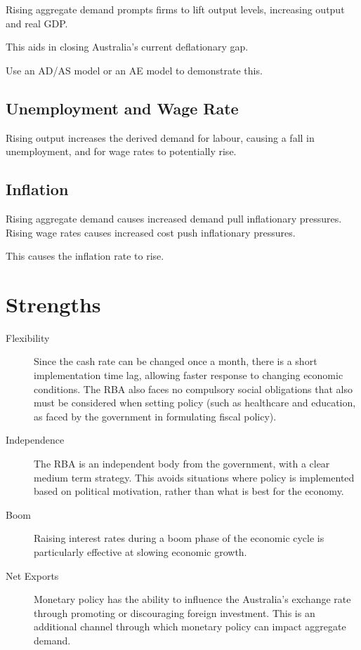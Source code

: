 \documentclass[a4paper,11pt]{report}
\begin{document}
Rising aggregate demand prompts firms to lift output levels, increasing output
and real GDP.

This aids in closing Australia's current deflationary gap.

Use an AD/AS model or an AE model to demonstrate this.

\subsection{Unemployment and Wage Rate}

Rising output increases the derived demand for labour, causing a fall in
unemployment, and for wage rates to potentially rise.

\subsection{Inflation}

Rising aggregate demand causes increased demand pull inflationary pressures.
Rising wage rates causes increased cost push inflationary pressures.

This causes the inflation rate to rise.


\section{Strengths}

\begin{description}
\item [Flexibility] Since the cash rate can be changed once a month, there is
	a short implementation time lag, allowing faster response to changing
	economic conditions. The RBA also faces no compulsory social obligations
	that also must be considered when setting policy (such as healthcare and
	education, as faced by the government in formulating fiscal policy).
\item [Independence] The RBA is an independent body from the government, with
	a clear medium term strategy. This avoids situations where policy is
	implemented based on political motivation, rather than what is best for the
	economy.
\item [Boom] Raising interest rates during a boom phase of the economic cycle
	is particularly effective at slowing economic growth.
\item [Net Exports] Monetary policy has the ability to influence the Australia's
	exchange rate through promoting or discouraging foreign investment. This is
	an additional channel through which monetary policy can impact aggregate
	demand.
\end{description}
\end{document}
